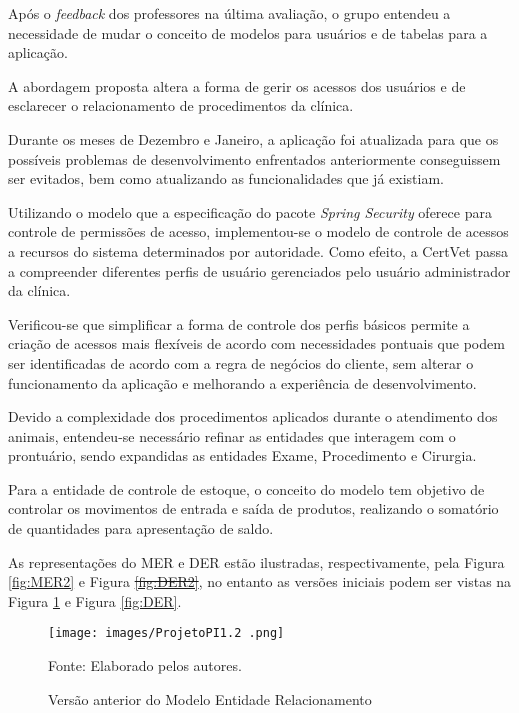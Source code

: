 \documentclass[
    12pt,               %
    openright,          %
    oneside,
    a4paper,            %
    BIBLATEX,           %
    TODO,               %
    english,            %
    brazil              %
    ]{ifsp-spo-inf-ctds}
\providecommand{\DIFadd}[1]{{\protect\color{blue}\uwave{#1}}} %
\providecommand{\DIFdel}[1]{{\protect\color{red}\sout{#1}}}                      %
\providecommand{\DIFaddbegin}{} %
\providecommand{\DIFaddend}{} %
\providecommand{\DIFdelbegin}{} %
\providecommand{\DIFdelend}{} %
\newcommand{\DIFscaledelfig}{0.5}
\newlength{\DIFdelgraphicswidth} %
\newlength{\DIFdelgraphicsheight} %
\newcommand{\DIFaddincludegraphics}[2][]{{\color{blue}\fbox{\DIFOincludegraphics[#1]{#2}}}} %
\newcommand{\DIFdelincludegraphics}[2][]{%
\sbox{\DIFdelgraphicsbox}{\DIFOincludegraphics[#1]{#2}}%
\settoboxwidth{\DIFdelgraphicswidth}{\DIFdelgraphicsbox} %
\settoboxtotalheight{\DIFdelgraphicsheight}{\DIFdelgraphicsbox} %
\scalebox{\DIFscaledelfig}{%
\parbox[b]{\DIFdelgraphicswidth}{\usebox{\DIFdelgraphicsbox}\\[-\baselineskip] \rule{\DIFdelgraphicswidth}{0em}}\llap{\resizebox{\DIFdelgraphicswidth}{\DIFdelgraphicsheight}{%
\setlength{\unitlength}{\DIFdelgraphicswidth}%
\begin{picture}(1,1)%
\thicklines\linethickness{2pt} %
{\color[rgb]{1,0,0}\put(0,0){\framebox(1,1){}}}%
{\color[rgb]{1,0,0}\put(0,0){\line( 1,1){1}}}%
{\color[rgb]{1,0,0}\put(0,1){\line(1,-1){1}}}%
\end{picture}%
}\hspace*{3pt}}} %
} %
\DeclareRobustCommand{\DIFaddbegin}{\DIFOaddbegin \let\includegraphics\DIFaddincludegraphics} %
\DeclareRobustCommand{\DIFaddend}{\DIFOaddend \let\includegraphics\DIFOincludegraphics} %
\DeclareRobustCommand{\DIFdelbegin}{\DIFOdelbegin \let\includegraphics\DIFdelincludegraphics} %
\DeclareRobustCommand{\DIFdelend}{\DIFOaddend \let\includegraphics\DIFOincludegraphics} %
\begin{document}
    Após o \emph{feedback} dos professores na última avaliação, o grupo entendeu a necessidade de mudar o conceito de modelos para usuários e de tabelas para a aplicação.

    A abordagem proposta altera a forma de gerir os acessos dos usuários e de esclarecer o relacionamento de procedimentos da clínica.

    Durante os meses de Dezembro e Janeiro, a aplicação foi atualizada para que os possíveis problemas de desenvolvimento enfrentados anteriormente conseguissem ser evitados, bem como atualizando as funcionalidades que já existiam.

    Utilizando o modelo que a especificação do pacote \emph{Spring Security} oferece para controle de permissões de acesso, implementou-se o modelo de controle de acessos a recursos do sistema determinados por autoridade. Como efeito, a CertVet passa a compreender diferentes perfis de usuário gerenciados pelo usuário administrador da clínica.

    Verificou-se que simplificar a forma de controle dos perfis básicos permite a criação de acessos mais flexíveis de acordo com necessidades pontuais que podem ser identificadas de acordo com a regra de negócios do cliente, sem alterar o funcionamento da aplicação e melhorando a experiência de desenvolvimento.

    Devido a complexidade dos procedimentos aplicados durante o atendimento dos animais, entendeu-se necessário refinar as entidades que interagem com o prontuário, sendo expandidas as entidades Exame, Procedimento e Cirurgia.

    Para a entidade de controle de estoque, o conceito do modelo tem objetivo de controlar os movimentos de entrada e saída de produtos, realizando o somatório de quantidades para apresentação de saldo.

    As representações do MER e DER  estão ilustradas, respectivamente, pela Figura \ref{fig:MER2} e Figura \DIFdelbegin \DIFdel{\ref{fig:DER2}}\DIFdelend \DIFaddbegin \DIFadd{\ref{fig:MERv2}}\DIFaddend , no entanto as versões iniciais podem ser vistas na Figura \ref{fig:MER} e Figura \ref{fig:DER}.

    \begin{figure}[H]
        \centering
        \caption{Versão anterior do Modelo Entidade Relacionamento}
        \texttt{[image: images/ProjetoPI1.2 .png]}

        \label{fig:MER}
        \centering
        {\footnotesize Fonte: Elaborado pelos autores.}
    \end{figure}
\end{document}
